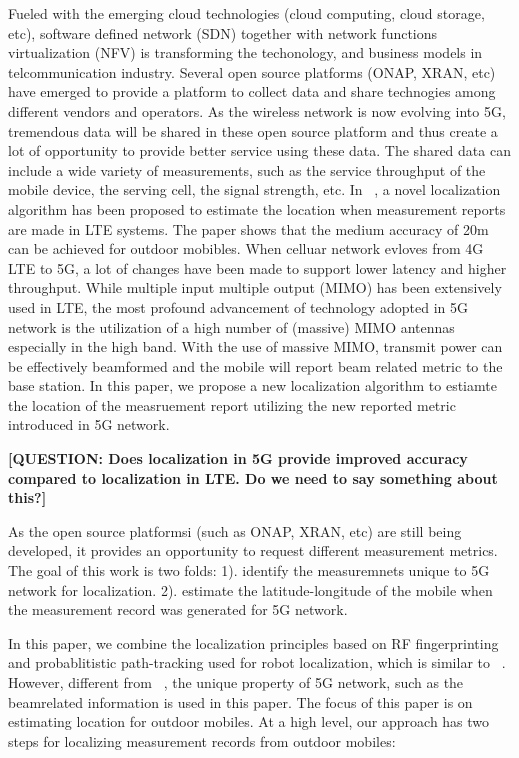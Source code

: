 \documentclass[conference, 10pt]{IEEEtran}
\begin{document}
Fueled with the emerging cloud technologies (cloud computing, cloud storage, etc), software defined network (SDN) together with 
network functions virtualization (NFV) is transforming the techonology, and business models in telcommunication industry.
Several open source platforms (ONAP, XRAN, etc) have emerged to provide a platform to collect data and share technogies among different 
vendors and operators. As the wireless network is now evolving into 5G, tremendous data will be shared in these open source platform and thus create 
a lot of opportunity to provide better service using these data. The shared data can include a wide variety of measurements, such as the service throughput of the mobile 
device, the serving cell, the signal strength, etc. In ~\cite{Pantelis2016Localization}, a novel localization algorithm has been proposed to estimate 
the location when measurement reports are made in LTE systems. The paper shows that the medium accuracy of 20m can be achieved for outdoor mobibles. 
When celluar network evloves from 4G LTE to 5G, a lot of changes have been made to support lower latency and higher throughput. While multiple input multiple output (MIMO) has been extensively used in LTE, the most profound advancement of technology adopted in 5G
network is the utilization of a high number of (massive) MIMO antennas especially in the high band. With the use of massive MIMO, transmit power can be effectively beamformed and the mobile will report beam related metric to the base station. 
In this paper, we propose a new localization algorithm to estiamte the location of the measruement report utilizing the new reported metric introduced in 5G network.
 
\textbf{[QUESTION: Does localization in 5G provide improved accuracy compared to localization in LTE. Do we need to say something about this?]}

As the open source platformsi (such as ONAP, XRAN, etc) are still being developed,  it provides an opportunity to request different measurement 
metrics. 
The goal of this work is two folds: 1). identify the measuremnets unique to 5G network for localization.
2). estimate the latitude-longitude of the mobile when the measurement record was
generated for 5G network. 

In this paper, we combine the localization principles based on RF 
fingerprinting and probablitistic path-tracking used for robot localization, which is similar to ~\cite{Pantelis2016Localization}. However, different from ~\cite{Pantelis2016Localization}, the unique property of 5G network, such as the beamrelated 
information is used in this paper. The focus of this paper is on estimating location for outdoor mobiles. 
At a high level, our approach has two steps for
localizing measurement records from outdoor mobiles:
\end{document}
